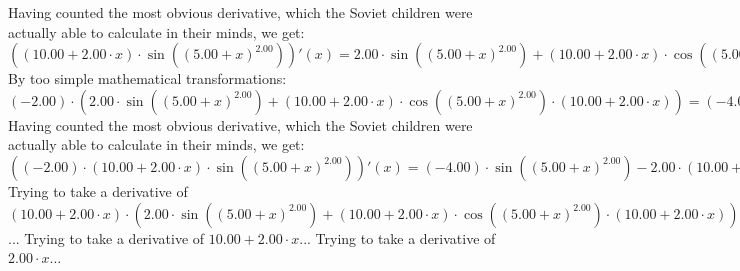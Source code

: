 \documentclass{article}
\begin{document}
Having counted the most obvious derivative, which the Soviet children were actually able to calculate in their minds, we get:
$({\left({{10.00} + {{2.00} \cdot {x}}}\right) \cdot  \sin {\left({\left({{5.00} + {x}}\right) ^ {2.00}}\right)} })'(x) = {{{2.00} \cdot  \sin {\left({\left({{5.00} + {x}}\right) ^ {2.00}}\right)} } + {\left({{10.00} + {{2.00} \cdot {x}}}\right) \cdot { \cos {\left({\left({{5.00} + {x}}\right) ^ {2.00}}\right)}  \cdot \left({{10.00} + {{2.00} \cdot {x}}}\right)}}}$\newline
\newline
By too simple mathematical transformations:
 ${\left({-2.00}\right) \cdot \left({{{2.00} \cdot  \sin {\left({\left({{5.00} + {x}}\right) ^ {2.00}}\right)} } + {\left({{10.00} + {{2.00} \cdot {x}}}\right) \cdot { \cos {\left({\left({{5.00} + {x}}\right) ^ {2.00}}\right)}  \cdot \left({{10.00} + {{2.00} \cdot {x}}}\right)}}}\right)} = {{\left({-4.00}\right) \cdot  \sin {\left({\left({{5.00} + {x}}\right) ^ {2.00}}\right)} } - {{2.00} \cdot {\left({{10.00} + {{2.00} \cdot {x}}}\right) \cdot { \cos {\left({\left({{5.00} + {x}}\right) ^ {2.00}}\right)}  \cdot \left({{10.00} + {{2.00} \cdot {x}}}\right)}}}}$ 
 \newline
 \newline 
Having counted the most obvious derivative, which the Soviet children were actually able to calculate in their minds, we get:
$({\left({-2.00}\right) \cdot {\left({{10.00} + {{2.00} \cdot {x}}}\right) \cdot  \sin {\left({\left({{5.00} + {x}}\right) ^ {2.00}}\right)} }})'(x) = {{\left({-4.00}\right) \cdot  \sin {\left({\left({{5.00} + {x}}\right) ^ {2.00}}\right)} } - {{2.00} \cdot {\left({{10.00} + {{2.00} \cdot {x}}}\right) \cdot { \cos {\left({\left({{5.00} + {x}}\right) ^ {2.00}}\right)}  \cdot \left({{10.00} + {{2.00} \cdot {x}}}\right)}}}}$\newline
\newline
Trying to take a derivative of ${\left({{10.00} + {{2.00} \cdot {x}}}\right) \cdot \left({{{2.00} \cdot  \sin {\left({\left({{5.00} + {x}}\right) ^ {2.00}}\right)} } + {\left({{10.00} + {{2.00} \cdot {x}}}\right) \cdot { \cos {\left({\left({{5.00} + {x}}\right) ^ {2.00}}\right)}  \cdot \left({{10.00} + {{2.00} \cdot {x}}}\right)}}}\right)}$...\newline
\newline
Trying to take a derivative of ${{10.00} + {{2.00} \cdot {x}}}$...\newline
\newline
Trying to take a derivative of ${{2.00} \cdot {x}}$...\newline
\end{document}
